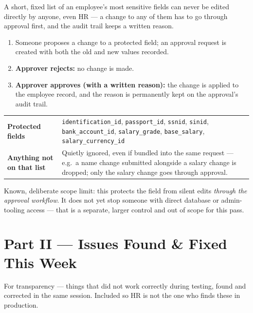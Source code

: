 \documentclass[11pt,a4paper]{article}
\begin{document}
A short, fixed list of an employee's most sensitive fields can never be edited directly by anyone, even HR --- a change to any of them has to go through approval first, and the audit trail keeps a written reason.

\begin{enumerate}[leftmargin=1.8em]
  \item Someone proposes a change to a protected field; an approval request is created with both the old and new values recorded.
  \item \textbf{Approver rejects:} no change is made.
  \item \textbf{Approver approves (with a written reason):} the change is applied to the employee record, and the reason is permanently kept on the approval's audit trail.
\end{enumerate}

\begin{center}
\small
\begin{tabular}{@{}p{4cm}p{9.5cm}@{}}
\toprule
\textbf{Protected fields} & \texttt{identification\_id}, \texttt{passport\_id}, \texttt{ssnid}, \texttt{sinid}, \texttt{bank\_account\_id}, \texttt{salary\_grade}, \texttt{base\_salary}, \texttt{salary\_currency\_id} \\
\textbf{Anything not on that list} & Quietly ignored, even if bundled into the same request --- e.g.\ a name change submitted alongside a salary change is dropped; only the salary change goes through approval. \\
\bottomrule
\end{tabular}
\end{center}

\begin{note}
Known, deliberate scope limit: this protects the field from silent edits \emph{through the approval workflow}. It does not yet stop someone with direct database or admin-tooling access --- that is a separate, larger control and out of scope for this pass.
\end{note}

\newpage
\part*{Part II --- Issues Found \& Fixed This Week}

For transparency --- things that did not work correctly during testing, found and corrected in the same session. Included so HR is not the one who finds these in production.
\end{document}
